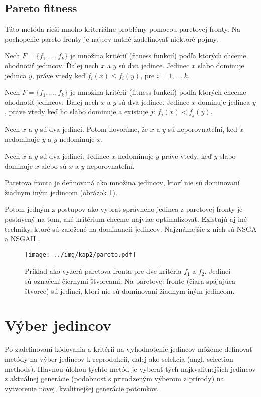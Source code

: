 \subsection{Pareto fitness}\label{kap2:2.3:2.3.3:Pareto}
Táto metóda rieši mnoho kriteriálne problémy pomocou paretovej fronty. Na pochopenie pareto fronty je najprv nutné zadefinovať niektoré pojmy.
\begin{def-sk}
Nech $F = \{f_{1}, \ldots, f_{k}\}$ je množina kritérií (fitness funkcií) podľa ktorých chceme ohodnotiť jedincov. Ďalej nech $x$ a $y$ sú dva jedince. Jedinec $x$ slabo dominuje jedinca $y$, práve vtedy keď $f_{i}(x) \leq f_{i}(y)$, pre $i = 1,\ldots,k$.
\end{def-sk}
\begin{def-sk}
Nech $F = \{f_{1}, \ldots, f_{k}\}$ je množina kritérií (fitness funkcií) podľa ktorých chceme ohodnotiť jedincov. Ďalej nech $x$ a $y$ sú dva jedince. Jedinec $x$ dominuje jedinca $y$, práve vtedy keď ho slabo dominuje a existuje $j$: $f_{j}(x) < f_{j}(y)$.
\end{def-sk}
\begin{def-sk}
Nech $x$ a $y$ sú dva jedinci. Potom hovoríme, že $x$ a $y$ sú neporovnateľní, keď $x$ nedominuje $y$ a $y$ nedominuje $x$.
\end{def-sk}
\begin{def-sk}
Nech $x$ a $y$ sú dva jedinci. Jedinec $x$ nedominuje $y$ práve vtedy, keď $y$ slabo dominuje $x$ alebo sú $x$ a $y$ neporovnateľní.
\end{def-sk}
\begin{def-sk}
Paretova fronta je definovaná ako množina jedincov, ktorí nie sú dominovaní žiadnym iným jedincom (obrázok \ref{fig:Pareto}).
\end{def-sk}
Potom jedným z postupov ako vybrať správneho jedinca z paretovej fronty je postavený na tom, aké kritérium chceme najviac optimalizovať. Existujú aj iné techniky, ktoré sú založené na dominancii jedincov. Najznámejšie z nich sú NSGA a NSGAII \cite{online-NSGA}.

\begin{figure}[h]
\centering
\centerline{\mbox{\texttt{[image: ../img/kap2/pareto.pdf]}}}
\caption{Príklad ako vyzerá paretova fronta pre dve kritéria $f_{1}$ a $f_{2}$. Jedinci sú označení čiernymi štvorcami. Na paretovej fronte (čiara spájajúca štvorce) sú jedinci, ktorí nie sú dominovaní žiadnym iným jedincom.}\label{fig:Pareto}
\end{figure}

\section{Výber jedincov}\label{kap2:2.4:Selection}
Po zadefinovaní kódovania a kritérií na vyhodnotenie jedincov môžeme definovať metódy na výber jedincov k reprodukcii, ďalej ako selekcia (angl. selection methods). Hlavnou úlohou týchto metód je vyberať tých najkvalitnejších jedincov z aktuálnej generácie (podobnosť s prirodzeným výberom z prírody) na vytvorenie novej, kvalitnejšej generácie potomkov.


